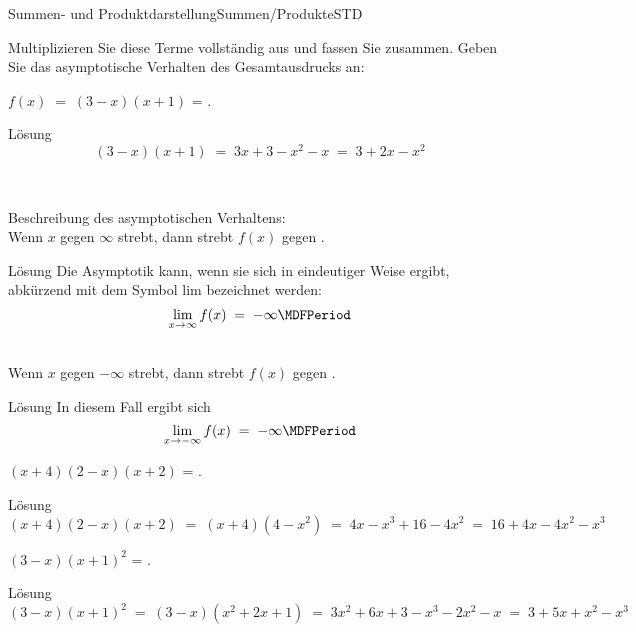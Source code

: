\begin{MXContent}{Summen- und Produktdarstellung}{Summen/Produkte}{STD}
\begin{MExercise}
Multiplizieren Sie diese Terme vollständig aus und fassen Sie zusammen. Geben Sie das asymptotische Verhalten des Gesamtausdrucks an:
\begin{MExerciseItems}
\item{$f(x)\;=\;(3-x)(x+1)$ = .
\begin{MHint}{Lösung}$$(3-x)(x+1) \; = \; 3x + 3 -x^2 -x \;=\; 3 + 2x - x^2 $$\end{MHint}\\
\begin{center}
Beschreibung des asymptotischen Verhaltens:\\ 
Wenn $x$ gegen $\infty$ strebt, dann strebt $f(x)$ gegen
\;. \begin{MHint}{Lösung}%
Die Asymptotik kann, wenn sie sich in eindeutiger Weise ergibt, abkürzend mit dem Symbol \glqq{}lim\grqq{} bezeichnet werden:
$$\lim_{x\rightarrow \infty} f(x) \; = \; -\infty \MDFPeriod$$\end{MHint}\\  %
Wenn $x$ gegen $-\infty$ strebt, dann strebt $f(x)$ gegen
\;. \\
\begin{MHint}{Lösung}%
In diesem Fall ergibt sich 
$$\lim_{x\rightarrow -\infty} f(x) \; = \; -\infty \MDFPeriod$$\end{MHint}
\end{center}
}
\item{$(x+4)(2-x)(x+2)$ = . \begin{MHint}{Lösung}$$(x+4)(2-x)(x+2) \; = \; (x+4)(4-x^2) \;=\; 4x-x^3+16-4x^2 \;=\; 16 + 4x - 4x^2 -x^3 $$\end{MHint}} %
\item{$(3-x)(x+1)^2$ = . \begin{MHint}{Lösung}$$(3-x)(x+1)^2 \; = \; (3-x)(x^2+2x+1) \;=\; 3x^2+6x+3-x^3-2x^2-x \;=\; 3 + 5x + x^2 -x^3 $$\end{MHint}}

\end{MExerciseItems}
\end{MExercise}
\end{MXContent}
